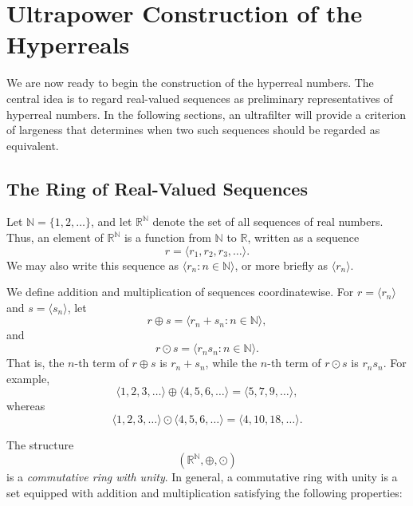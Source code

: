 \section{Ultrapower Construction of the Hyperreals}

We are now ready to begin the construction of the hyperreal numbers. The
central idea is to regard real-valued sequences as preliminary
representatives of hyperreal numbers. In the following sections, an
ultrafilter will provide a criterion of largeness that determines when two
such sequences should be regarded as equivalent.

\subsection{The Ring of Real-Valued Sequences}

Let $\mathbb{N}=\{1,2,\ldots\}$,
and let \(\mathbb{R}^{\mathbb{N}}\) denote the set of all sequences of real
numbers. Thus, an element of \(\mathbb{R}^{\mathbb{N}}\) is a function from
\(\mathbb{N}\) to \(\mathbb{R}\), written as a sequence
\[
r=\langle r_1,r_2,r_3,\ldots\rangle.
\]
We may also write this sequence as \(\langle r_n:n\in\mathbb{N}\rangle\), or
more briefly as \(\langle r_n\rangle\).

We define addition and multiplication of sequences coordinatewise. For
\(r=\langle r_n\rangle\) and \(s=\langle s_n\rangle\), let
\[
r\oplus s=\langle r_n+s_n:n\in\mathbb{N}\rangle,
\]
and
\[
r\odot s=\langle r_ns_n:n\in\mathbb{N}\rangle.
\]
That is, the \(n\)-th term of \(r\oplus s\) is \(r_n+s_n\), while the
\(n\)-th term of \(r\odot s\) is \(r_ns_n\). For example,
\[
\langle 1,2,3,\ldots\rangle
\oplus
\langle 4,5,6,\ldots\rangle
=
\langle 5,7,9,\ldots\rangle,
\]
whereas
\[
\langle 1,2,3,\ldots\rangle
\odot
\langle 4,5,6,\ldots\rangle
=
\langle 4,10,18,\ldots\rangle.
\]

The structure
\[
(\mathbb{R}^{\mathbb{N}},\oplus,\odot)
\]
is a \emph{commutative ring with unity}. In general, a commutative ring with
unity is a set equipped with addition and multiplication satisfying the
following properties:

